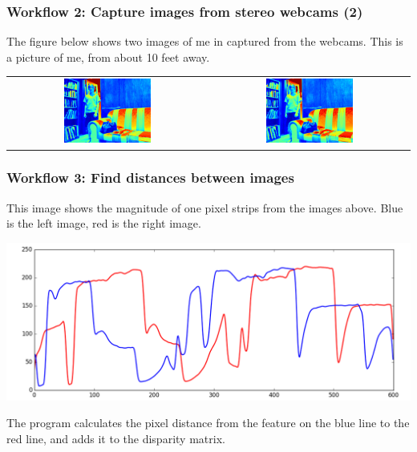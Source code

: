 \documentclass[19pt]{beamer}
\begin{document}
\begin{frame}
\frametitle{Workflow 2: Capture images from stereo webcams (2)}

The figure below shows two images of me in captured from the webcams. 
This is a picture of me, from about 10 feet away.\\[20pt]

\begin{center}
\setlength{}
\begin{tabular}{cc}
\includegraphics[width=0.45\textwidth]{images/l.png} &
\includegraphics[width=0.45\textwidth]{images/r.png} 
\end{tabular}
\end{center}

\end{frame}


\begin{frame}
\frametitle{Workflow 3: Find distances between images}
This image shows the magnitude of one pixel strips from the images above. Blue is the left image, red is the right image.
\begin{center}
\includegraphics[width=1\textwidth]{images/strips.png} \\[10pt]
\end{center}
The program calculates the pixel distance from the feature on the blue line to the red line, and adds it to the disparity matrix.
\end{frame}
\end{document}
